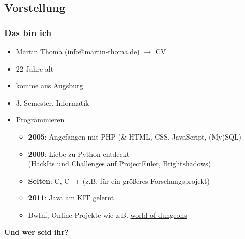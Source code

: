 \documentclass[usepdftitle=false,hyperref={pdfpagelabels=false}]{beamer}
\begin{document}
\subsection{Vorstellung}
\begin{frame}
    \frametitle{Das bin ich}
    \begin{itemize}
      \item Martin Thoma (\href{mailto:info@martin-thoma.de}{info@martin-thoma.de}) $\rightarrow$ \href{http://www.martin-thoma.de/about.htm}{CV}
      \item 22 Jahre alt
      \item komme aus Augsburg
      \item 3. Semester, Informatik
      \item Programmieren
        \begin{itemize}
            \item \textbf{2005}: Angefangen mit PHP (\& HTML, CSS, JavaScript, (My)SQL)
            \item \textbf{2009}: Liebe zu Python entdeckt \\
                  (\href{http://martin-thoma.com/challenge-websites/}{HackIts und Challenges} auf ProjectEuler, Brightshadows)
            \item \textbf{Selten}: C, C++ (z.B. für ein größeres Forschungsprojekt)
            \item \textbf{2011}: Java am KIT gelernt
            \item BwInf, Online-Projekte wie z.B. \href{http://world-of-dungeons.net/}{world-of-dungeons}
        \end{itemize}
    \end{itemize}
    \textbf{Und wer seid ihr?}
\end{frame}
\end{document}
